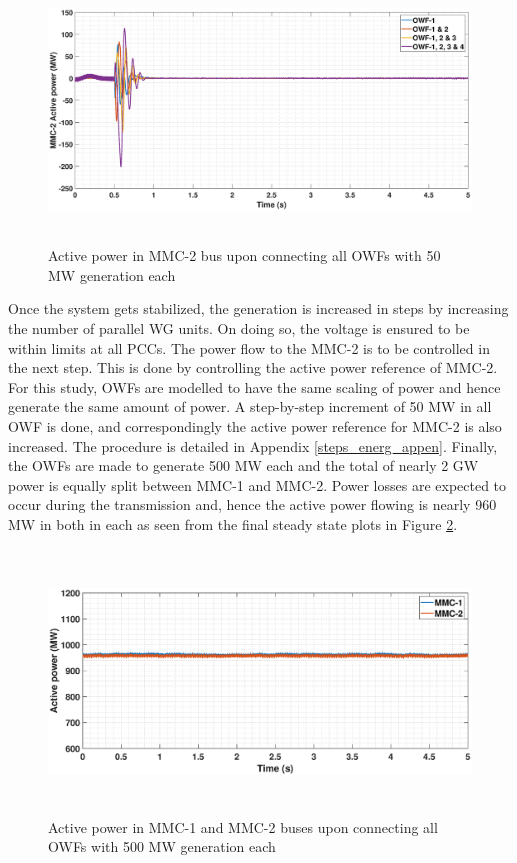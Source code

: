 \begin{figure}[H]
    \includegraphics[height = 7cm,width = \textwidth]{Diagrams/Chapter_5/P_MMC_2_WT1234connect_2.eps}
    \caption{Active power in MMC-2 bus upon connecting all OWFs with 50 MW generation each}
    \label{P_MMC_2_WT1234connect}
\end{figure}

Once the system gets stabilized, the generation is increased in steps by increasing the number of parallel \gls{WG} units. On doing so, the voltage is ensured to be within limits at all \gls{PCC}s. The power flow to the \gls{MMC}-2 is to be controlled in the next step. This is done by controlling the active power reference of \gls{MMC}-2. For this study, \gls{OWF}s are modelled to have the same scaling of power and hence generate the same amount of power. A step-by-step increment of 50 MW in all \gls{OWF} is done, and correspondingly the active power reference for \gls{MMC}-2 is also increased. The procedure is detailed in Appendix \ref{steps_energ_appen}. Finally, the \gls{OWF}s are made to generate 500 MW each and the total of nearly 2 GW power is equally split between \gls{MMC}-1 and \gls{MMC}-2. Power losses are expected to occur during the transmission and, hence the active power flowing is nearly 960 MW in both in each as seen from the final steady state plots in Figure \ref{P_MMC_1_2_All_WTconnect}.

\begin{figure}[H]
\centering
    \includegraphics[height = 7cm,width = \textwidth]{Diagrams/Chapter_5/P_MMC_1_2_All_WTconnect.eps}
    \caption{Active power in MMC-1 and MMC-2 buses upon connecting all OWFs with 500 MW generation each}
    \label{P_MMC_1_2_All_WTconnect}
\end{figure}

